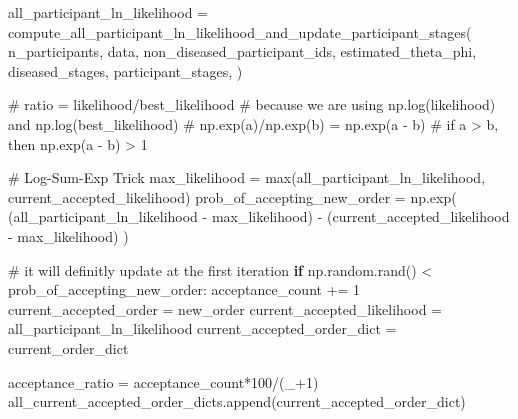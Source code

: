 \documentclass[
  letterpaper,
  DIV=11,
  numbers=noendperiod]{scrreprt}
\newenvironment{Shaded}{\begin{snugshade}}{\end{snugshade}}
\newcommand{\BuiltInTok}[1]{\textcolor[rgb]{0.00,0.23,0.31}{#1}}
\newcommand{\CommentTok}[1]{\textcolor[rgb]{0.37,0.37,0.37}{#1}}
\newcommand{\ControlFlowTok}[1]{\textcolor[rgb]{0.00,0.23,0.31}{\textbf{#1}}}
\newcommand{\DecValTok}[1]{\textcolor[rgb]{0.68,0.00,0.00}{#1}}
\newcommand{\NormalTok}[1]{\textcolor[rgb]{0.00,0.23,0.31}{#1}}
\newcommand{\OperatorTok}[1]{\textcolor[rgb]{0.37,0.37,0.37}{#1}}
\begin{document}
\begin{Shaded}
\begin{Highlighting}[]
\NormalTok{        all\_participant\_ln\_likelihood }\OperatorTok{=}\NormalTok{ compute\_all\_participant\_ln\_likelihood\_and\_update\_participant\_stages(}
\NormalTok{            n\_participants,}
\NormalTok{            data,}
\NormalTok{            non\_diseased\_participant\_ids,}
\NormalTok{            estimated\_theta\_phi,}
\NormalTok{            diseased\_stages,}
\NormalTok{            participant\_stages,}
\NormalTok{        )}

        \CommentTok{\# ratio = likelihood/best\_likelihood}
        \CommentTok{\# because we are using np.log(likelihood) and np.log(best\_likelihood)}
        \CommentTok{\# np.exp(a)/np.exp(b) = np.exp(a {-} b)}
        \CommentTok{\# if a \textgreater{} b, then np.exp(a {-} b) \textgreater{} 1}

        \CommentTok{\# Log{-}Sum{-}Exp Trick}
\NormalTok{        max\_likelihood }\OperatorTok{=} \BuiltInTok{max}\NormalTok{(all\_participant\_ln\_likelihood,}
\NormalTok{                             current\_accepted\_likelihood)}
\NormalTok{        prob\_of\_accepting\_new\_order }\OperatorTok{=}\NormalTok{ np.exp(}
\NormalTok{            (all\_participant\_ln\_likelihood }\OperatorTok{{-}}\NormalTok{ max\_likelihood) }\OperatorTok{{-}}
\NormalTok{            (current\_accepted\_likelihood }\OperatorTok{{-}}\NormalTok{ max\_likelihood)}
\NormalTok{        )}
        
        \CommentTok{\# it will definitly update at the first iteration}
        \ControlFlowTok{if}\NormalTok{ np.random.rand() }\OperatorTok{\textless{}}\NormalTok{ prob\_of\_accepting\_new\_order:}
\NormalTok{            acceptance\_count }\OperatorTok{+=} \DecValTok{1}
\NormalTok{            current\_accepted\_order }\OperatorTok{=}\NormalTok{ new\_order}
\NormalTok{            current\_accepted\_likelihood }\OperatorTok{=}\NormalTok{ all\_participant\_ln\_likelihood}
\NormalTok{            current\_accepted\_order\_dict }\OperatorTok{=}\NormalTok{ current\_order\_dict}

\NormalTok{        acceptance\_ratio }\OperatorTok{=}\NormalTok{ acceptance\_count}\OperatorTok{*}\DecValTok{100}\OperatorTok{/}\NormalTok{(\_}\OperatorTok{+}\DecValTok{1}\NormalTok{)}
\NormalTok{        all\_current\_accepted\_order\_dicts.append(current\_accepted\_order\_dict)}


\end{Highlighting}
\end{Shaded}
\end{document}
